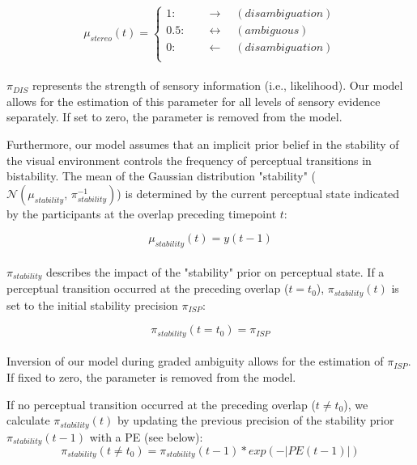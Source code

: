 \documentclass[12pt]{article}
\begin{document}
\begin{equation}
\mu_{stereo}(t) =
\begin{cases}
1:& \quad \rightarrow \quad (disambiguation) \\
0.5:&  \quad \leftrightarrow \quad (ambiguous) \\
0:&  \quad \leftarrow \quad (disambiguation) \\
\end{cases}
\end{equation}\\

$\pi_{DIS}$ represents the strength of sensory information (i.e., likelihood). Our model allows for the estimation of this parameter for all levels of sensory evidence separately. If set to zero, the parameter is removed from the model. 

Furthermore, our model assumes that an implicit prior belief in the stability of the visual environment controls the frequency of perceptual transitions in bistability. The mean of the Gaussian distribution "stability" ($\mathcal{N}(\mu_{stability},\,\pi_{stability}^{-1})$) is determined by the current perceptual state indicated by the participants at the overlap preceding timepoint $t$:

\begin{equation}
 \mu_{stability}(t) = y(t-1)
\end{equation} \\ 

$\pi_{stability}$ describes the impact of the "stability" prior on perceptual state. If a perceptual transition occurred at the preceding overlap ($t=t_0$), $\pi_{stability}(t)$ is set to the initial stability precision $\pi_{ISP}$:

\begin{equation}
 \pi_{stability}(t = t_0) = \pi_{ISP}
\end{equation} \\

Inversion of our model during graded ambiguity allows for the estimation of $\pi_{ISP}$. If fixed to zero, the parameter is removed from the model. 

If no perceptual transition occurred at the preceding overlap ($t \neq t_0$), we calculate $\pi_{stability}(t)$ by updating the previous precision of the stability prior $\pi_{stability}(t-1)$ with a PE (see below):
\begin{equation}
 \pi_{stability}(t \neq t_0) = \pi_{stability}(t-1)*exp(-|PE(t-1)|)
\end{equation} \\
\end{document}
